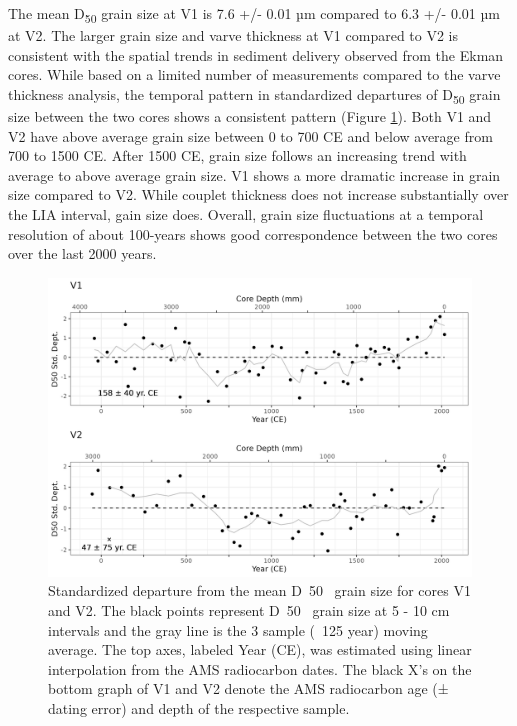 \documentclass[Royal,times,doublespace,sageh]{sagej}
\begin{document}
The mean D\textsubscript{50} grain size at V1 is 7.6 +/- 0.01 µm
compared to 6.3 +/- 0.01 µm at V2. The larger grain size and varve
thickness at V1 compared to V2 is consistent with the spatial trends in
sediment delivery observed from the Ekman cores. While based on a
limited number of measurements compared to the varve thickness analysis,
the temporal pattern in standardized departures of D\textsubscript{50}
grain size between the two cores shows a consistent pattern (Figure
\ref{fig:particle}). Both V1 and V2 have above average grain size
between 0 to 700 CE and below average from 700 to 1500 CE. After 1500
CE, grain size follows an increasing trend with average to above average
grain size. V1 shows a more dramatic increase in grain size compared to
V2. While couplet thickness does not increase substantially over the LIA
interval, gain size does. Overall, grain size fluctuations at a temporal
resolution of about 100-years shows good correspondence between the two
cores over the last 2000 years.

\begin{figure}

{\centering \includegraphics[width=1\linewidth]{figs/V1_V2_grainsize_vs_depth_and_C14_est_yr} 

}

\caption{Standardized departure from the mean D~50~ grain size for cores V1 and V2. The black points represent D~50~ grain size at 5 - 10 cm intervals and the gray line is the 3 sample (~125 year) moving average. The top axes, labeled Year (CE), was estimated using linear interpolation from the AMS radiocarbon dates. The black X's on the bottom graph of V1 and V2 denote the AMS radiocarbon age (± dating error) and depth of the respective sample.\label{particle}}\label{fig:particle}
\end{figure}
\end{document}
